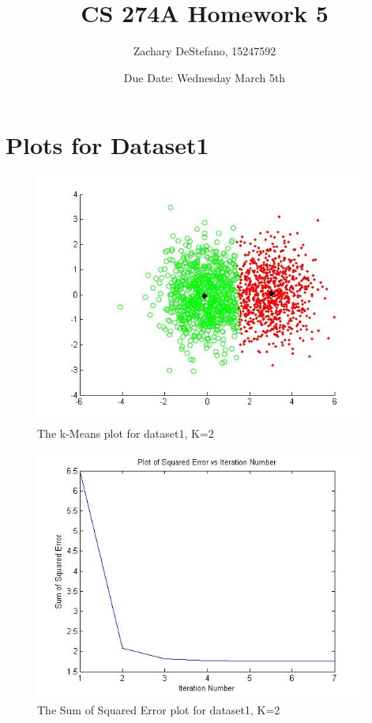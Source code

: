 \documentclass[11pt,psfig]{article}
\begin{document}
\setlength{\parskip}{1.2ex plus0.3ex minus 0.3ex}


\thispagestyle{empty} \pagestyle{myheadings} 



\title{CS 274A Homework 5}
\author{Zachary DeStefano, 15247592}
\date{Due Date: Wednesday March 5th}

\maketitle

 \newpage

\section*{Plots for Dataset1}

\begin{figure}[H]
\centering
\includegraphics[height=3.25in]{dataset1_kMeansPlot.jpg}
\caption{The k-Means plot for dataset1, K=2}
\end{figure}

\begin{figure}[H]
\centering
\includegraphics[height=3.25in]{dataset1_kMeans_squaredErrorPlot.jpg}
\caption{The Sum of Squared Error plot for dataset1, K=2}
\end{figure}
\end{document}
